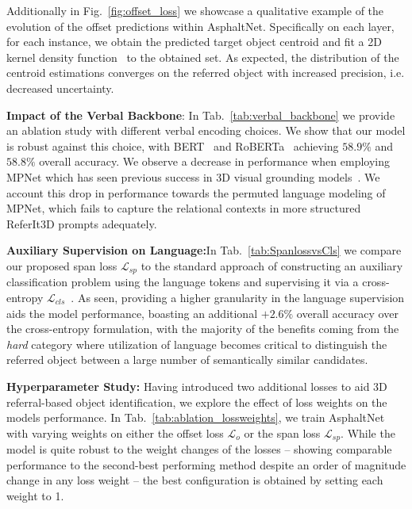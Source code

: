 \documentclass[10pt,twocolumn,letterpaper]{article}
\begin{document}
Additionally in Fig.~\ref{fig:offset_loss} we showcase a qualitative example of the evolution of the offset predictions within AsphaltNet. Specifically on each layer, for each instance, we obtain the predicted target object centroid and fit a 2D kernel density function~\cite{wand1994kernel} to the obtained set. As expected, the distribution of the centroid estimations converges on the referred object with increased precision, i.e. decreased uncertainty.
\vspace{3px}

\noindent \textbf{Impact of the Verbal Backbone}: In Tab.~\ref{tab:verbal_backbone} we provide an ablation study with different verbal encoding choices. We show that our model is robust against this choice, with BERT~\cite{devlin2018bert} and RoBERTa~\cite{liu2019roberta} achieving $58.9\%$ and $58.8\%$ overall accuracy. We observe a decrease in performance when employing MPNet which has seen previous success in 3D visual grounding models~\cite{unal2023ways}. We account this drop in performance towards the permuted language modeling of MPNet, which fails to capture the relational contexts in more structured ReferIt3D prompts adequately.

\noindent \textbf{Auxiliary Supervision on Language:}In Tab.~\ref{tab:SpanlossvsCls} we compare our proposed span loss $\mathcal{L}_{sp}$ to the standard approach of constructing an auxiliary classification problem using the language tokens and supervising it via a cross-entropy $\mathcal{L}_{cls}$~\cite{chen2020scanrefer, zhao2021_3DVG_Transformer}. As seen, providing a higher granularity in the language supervision aids the model performance, boasting an additional $+2.6\%$ overall accuracy over the cross-entropy formulation, with the majority of the benefits coming from the \textit{hard} category where utilization of language becomes critical to distinguish the referred object between a large number of semantically similar candidates.

\noindent \textbf{Hyperparameter Study:} Having introduced two additional losses to aid 3D referral-based object identification, we explore the effect of loss weights on the models performance. In Tab.~\ref{tab:ablation_lossweights}, we train AsphaltNet with varying weights on either the offset loss $\mathcal{L}_o$ or the span loss $\mathcal{L}_{sp}$. While the model is quite robust to the weight changes of the losses -- showing comparable performance to the second-best performing method despite an order of magnitude change in any loss weight -- the best configuration is obtained by setting each weight to 1.
\end{document}
